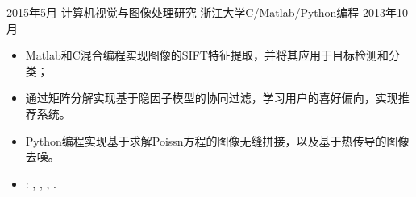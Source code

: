 %
%


 
\begin{experiences}
			
 \experience
    {2015年5月}   {计算机视觉与图像处理研究}{ 浙江大学}{C/Matlab/Python编程}
    {2013年10月} {
                      \begin{itemize}
                        \item Matlab和C混合编程实现图像的SIFT特征提取，并将其应用于目标检测和分类；
                        \item 通过矩阵分解实现基于隐因子模型的协同过滤，学习用户的喜好偏向，实现推荐系统。
                        \item Python编程实现基于求解Poissn方程的图像无缝拼接，以及基于热传导的图像去噪。
                        \item \faGithub: 
                        , 
                        ,
                        ,
                        .                                                                                       
                      \end{itemize}
                    }	
{}	
\end{experiences}
